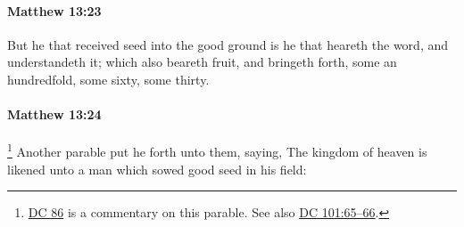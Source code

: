 		\paragraph{Matthew 13:23} %
			\label{MATTHEW-13-23}

			But he that received seed into the good ground is he that heareth the word, and understandeth it; which also beareth fruit, and bringeth forth, some an hundredfold, some sixty, some thirty.

			\begin{framed}
			\scriptsize
				\begin{compactdesc}
					\item[SBLG] 
				\end{compactdesc}
			\end{framed}

		\paragraph{Matthew 13:24} %
			\label{MATTHEW-13-24}

				\footnote{%
					\hyperref[DC86]{DC 86} is a commentary on this parable. See also \hyperref[DC101-65]{DC 101:65--66}.
					}%
			Another parable put he forth unto them, saying, The kingdom of heaven is likened unto a man which sowed good seed in his field:

